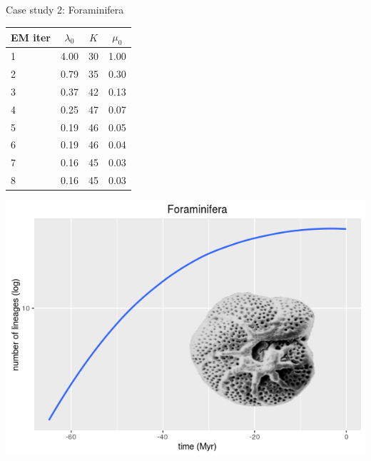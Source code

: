 \documentclass[final]{beamer}
\begin{document}
\begin{frame}[t]
\begin{columns}[t]
     \begin{column}{0.28\paperwidth}   
   \begin{block}{{\small Case study 2: Foraminifera}}
  
    \begin{minipage}{\textwidth}
   
   \begin{minipage}[b]{0.49\textwidth}
    \centering
    \tabcolsep=0.21cm
    {\footnotesize
   \begin{tabular}{lccc}
  \hline
EM iter & $\lambda_0$ & $K$ & $\mu_0$ \\ 
  \hline
1 & 4.00 & 30 & 1.00 \\ 
  2 & 0.79 & 35 & 0.30 \\ 
  3 & 0.37 & 42 & 0.13 \\ 
  4 & 0.25 & 47 & 0.07 \\ 
  5 & 0.19 & 46 & 0.05 \\ 
  6 & 0.19 & 46 & 0.04 \\ 
  7 & 0.16 & 45 & 0.03 \\ 
  8 & 0.16 & 45 & 0.03 \\ 
   \hline
\end{tabular} }
    \end{minipage}
  \begin{minipage}[b]{0.49\textwidth}
    \centering
    \includegraphics[width=1.12\linewidth]{figures/foraminifera2.png}
  \end{minipage}
  \end{minipage}


\end{block}
\end{column}
\end{columns}
\end{frame}
\end{document}
